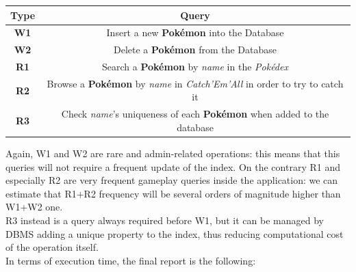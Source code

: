\begin{center}
	\begin{tabular}{|c | c |} 
		\hline
		\textbf{Type} & \textbf{Query} \\ [0.5ex] 
		\hline
		\textbf{W1} & Insert a new \textbf{Pokémon} into the Database \\ 
		\hline
		\textbf{W2} & Delete a \textbf{Pokémon} from the Database \\
		\hline
		\textbf{R1} & Search a \textbf{Pokémon} by \textit{name} in the \textit{Pokédex} \\
		\hline
		\textbf{R2} & Browse a \textbf{Pokémon} by \textit{name} in \textit{Catch’Em’All} in order to try to catch it \\
		\hline
		\textbf{R3} & Check \textit{name}’s uniqueness of each \textbf{Pokémon} when added to the database \\
		\hline
	\end{tabular}
\end{center}

Again, W1 and W2 are rare and admin-related operations: this means that this queries will not require a frequent update of the index. On the contrary R1 and especially R2 are very frequent gameplay queries inside the application: we can estimate that R1+R2 frequency will be several orders of magnitude higher than W1+W2 one. \\
R3 instead is a query always required before W1, but it can be managed by DBMS adding a unique property to the index, thus reducing computational cost of the operation itself. \\
In terms of execution time, the final report is the following:  

